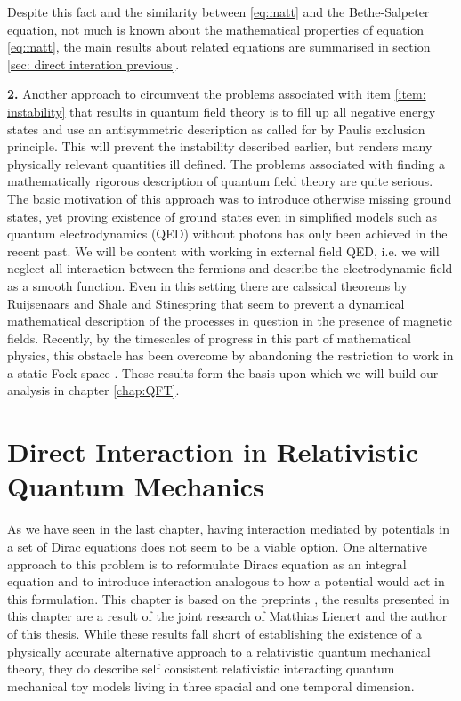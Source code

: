 \documentclass[b5paper,draft,openbib,12pt]{memoir}
\renewcommand\afterchaptertitle{%
\vskip 0pt
\hrulefill
\par \nobreak  \vskip  \afterchapskip  }
\begin{document}
Despite this fact and the similarity between \eqref{eq:matt}
and the Bethe-Salpeter equation, not much is known about the 
mathematical properties of equation \eqref{eq:matt}, 
the main results about related equations are summarised in section 
\ref{sec: direct interation previous}.


\textbf{2.} Another approach to circumvent the problems associated with 
item \ref{item: instability} that results in quantum field theory 
is to fill up all negative energy states and use an antisymmetric 
description as called for by Paulis exclusion principle. This will 
prevent the instability described earlier, but renders many 
physically relevant quantities ill defined.
The problems associated with finding a mathematically rigorous 
description of quantum field theory are quite serious.
The basic motivation of this approach was to introduce 
otherwise missing ground states, yet proving existence of 
ground states even in simplified models such as 
quantum electrodynamics (QED) without photons has only 
been achieved in the recent past\cite{hainzl2005existence}.
We 
will be content with working in external field QED,
i.e. we will neglect all interaction between the fermions and 
describe the electrodynamic field as a smooth
function. 
Even in this setting there are calssical theorems by 
Ruijsenaars\cite{ruijsenaars1977charged} and 
Shale and Stinespring\cite{shale1965spinor} that seem to 
prevent a dynamical mathematical description of the processes in 
question in the presence of magnetic fields. 
Recently, by the timescales of progress in this 
part of mathematical physics, this obstacle has been overcome 
by abandoning the restriction to work in a static Fock space
\cite{ivp0,ivp1,ivp2}.
These results form the basis upon which we will 
build our analysis in chapter \ref{chap:QFT}.










\chapter[Direct Interaction in Relativistic Quantum Mechanics][Direct Interaction]{Direct Interaction in Relativistic Quantum Mechanics}\label{chap: direct interaction}
As we have seen in the last chapter, having interaction mediated by potentials 
in a set of Dirac equations does not seem to be a viable option.
One alternative approach to this problem is to reformulate Diracs equation as 
an integral equation and to introduce interaction analogous 
to how a potential would act in this formulation. 
This chapter is based on  the preprints \cite{selfDirac,selfKG},
the results presented in this chapter are a result of the joint
research of Matthias Lienert and the author of this thesis. 
While these results fall short of establishing the existence 
of a physically accurate alternative approach to 
a relativistic quantum mechanical theory, they do describe 
self consistent relativistic interacting quantum mechanical 
toy models living in three spacial and one temporal dimension.
\end{document}
